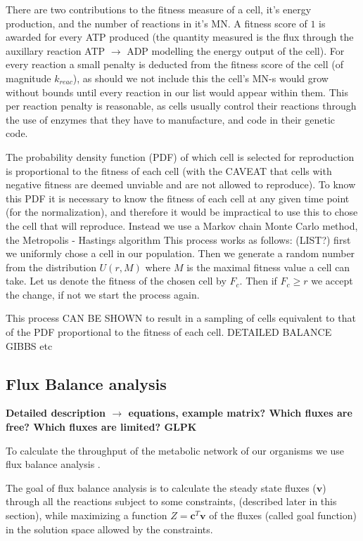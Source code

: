 \documentclass[10pt,a4paper]{article}
\begin{document}
There are two contributions to the fitness measure of a cell, it's energy production, and the number of reactions in it's MN.  A fitness score of $1$ is awarded for every ATP produced (the quantity measured is the flux through the auxillary reaction ATP $\rightarrow$ ADP modelling the energy output of the cell). For every reaction a small penalty is deducted from the fitness score of the cell (of magnitude $k_{reac}$), as should we not include this the cell's MN-s would grow without bounds until every reaction in our list would appear within them. This per reaction penalty is reasonable, as cells usually control their reactions through the use of enzymes that they have to manufacture, and code in their genetic code. 

The probability density function (PDF) of which cell is selected for reproduction is proportional to the fitness of each cell (with the CAVEAT that cells with negative fitness are deemed unviable and are not allowed to reproduce). To know this PDF it is necessary to know the fitness of each cell at any given time point (for the normalization), and therefore it would be impractical to use this to chose the cell that will reproduce. Instead we use a Markov chain Monte Carlo method, the Metropolis - Hastings algorithm This process works as follows: (LIST?) first we uniformly chose a cell in our population. Then we generate a random number from the distribution $U \left( r,M \right)$ where $M$ is the maximal fitness value a cell can take. Let us denote the fitness of the chosen cell by $F_c$. Then if $F_c \geq r$ we accept the change, if not we start the process again. 

This process CAN BE SHOWN to result in a sampling of cells equivalent to that of the PDF proportional to the fitness of each cell. DETAILED BALANCE ~ GIBBS etc

\subsection{Flux Balance analysis}
\label{sub:Flux Balance analysis}

\textbf{Detailed description $\rightarrow$ equations, example matrix? Which fluxes are free? Which fluxes are limited? GLPK }



	To calculate the throughput of the metabolic network of our organisms we use flux balance analysis \cite{whatisfluxbalance}. 	

	The goal of flux balance analysis is to calculate the steady state fluxes ($\mathbf{v}$) through all the reactions subject to some constraints, (described later in this section), while maximizing a function $Z=\mathbf{c}^T \mathbf{v}$ of the fluxes (called goal function) in the solution space allowed by the constraints. 
\end{document}
